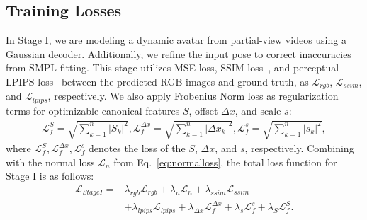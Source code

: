 \subsection{Training Losses}
\label{trainingLosses}
In Stage I, we are modeling a dynamic avatar from partial-view videos using a Gaussian decoder. Additionally, we refine the input pose to correct inaccuracies from SMPL fitting. This stage utilizes MSE loss, SSIM loss~\cite{SSIM}, and perceptual LPIPS loss~\cite{zhang2018unreasonable} between the predicted RGB images and ground truth, as $\mathcal{L}_{rgb}$, $\mathcal{L}_{ssim}$, and $\mathcal{L}_{lpips}$, respectively.
We also apply Frobenius Norm loss as regularization terms for optimizable canonical features $S$, offset $\Delta x$, and scale $s$:
\begin{equation}
\begin{aligned}
\mathcal{L}_{f}^{S} = \sqrt{\sum_{k=1}^{n} |S_{k}|^{2}}, 
\mathcal{L}_{f}^{\Delta x} = \sqrt{\sum_{k=1}^{n} |\Delta x_{k}|^{2}},
\mathcal{L}_{f}^{s} = \sqrt{\sum_{k=1}^{n} |s_{k}|^{2}},
\end{aligned}
\label{eq:lossL2}
\end{equation}
where $\mathcal{L}_{f}^{S}, \mathcal{L}_{f}^{\Delta x},\mathcal{L}_{f}^{s}$ denotes the loss of the $S$, $\Delta x$, and $s$, respectively.
Combining with the normal loss $\mathcal{L}_{n}$ from Eq.~\ref{eq:normalloss}, the total loss function for Stage I is as follows:
\begin{equation}
\begin{aligned}
\mathcal{L}_{StageI}= &\lambda_{rgb}\mathcal{L}_{rgb}+\lambda_{n}\mathcal{L}_{n}+\lambda_{ssim}\mathcal{L}_{ssim}\\
&+\lambda_{lpips}\mathcal{L}_{lpips}+\lambda_{\Delta x}\mathcal{L}_{f}^{\Delta x}+\lambda_{s}\mathcal{L}_{f}^{s}+\lambda_{S}\mathcal{L}_{f}^{S}.
\end{aligned}
  \label{eq:lossstage1}
\end{equation}

